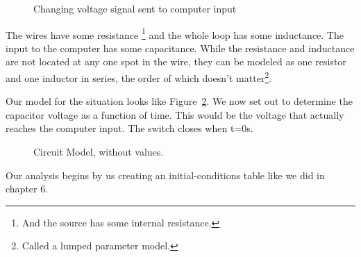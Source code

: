 \begin{figure}[H]
\begin{center}
\caption{Changing voltage signal sent to computer input}
\label{F:7EX}
\end{center}
\end{figure}

The wires have some resistance \footnote{And the source has some internal resistance.} and the whole loop has some inductance. The input to the computer has some capacitance. While the resistance and inductance are not located at any one spot in the wire, they can be modeled as one resistor and one inductor in series, the order of which doesn't matter\footnote{Called a lumped parameter model.}.
\par
Our model for the situation looks like Figure~\ref{F:7EX2}. We now set out to determine the capacitor voltage as a function of time. This would be the voltage that actually reaches the computer input. The switch closes when t=0s. 

\begin{figure}[H]
\begin{center}
\caption{Circuit Model, without values.}
\label{F:7EX2}
\end{center}
\end{figure}

Our analysis begins by us creating an initial-conditions table like we did in chapter 6.\linebreak

